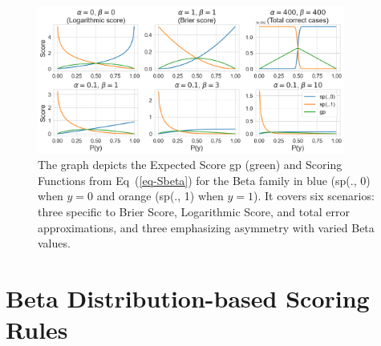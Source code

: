 \documentclass[letterpaper]{article} %
\begin{document}
\begin{figure}[!t]
\centering
    \includegraphics[width=0.9\textwidth]{figures/betagp_blt.png}
    \caption{
    The graph depicts the Expected Score gp (green) and Scoring Functions from Eq~(\ref{eq-Sbeta}) for the Beta family in blue (sp(., 0) when $y=0$ and orange (sp(., 1) when $y=1$). It covers six scenarios: three specific to Brier Score, Logarithmic Score, and total error approximations, and three emphasizing asymmetry with varied Beta values.
    }
    \label{fig:betagp_blt}
\end{figure}

\section{Beta Distribution-based Scoring Rules}
\label{sec:Method}
\end{document}
